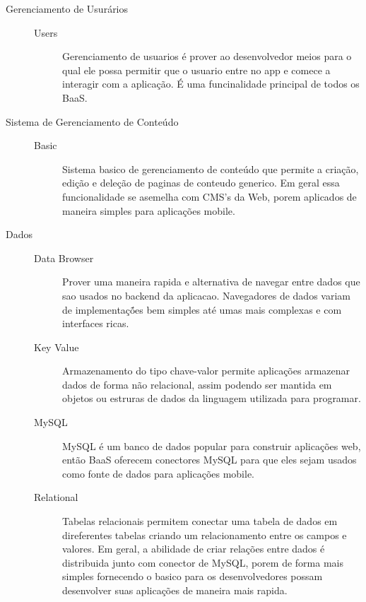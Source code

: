 	\begin{description}
		\item[Gerenciamento de Usurários]
			\begin{description}
            	\item[]
				\item[Users]{Gerenciamento de usuarios é prover ao  desenvolvedor meios para o qual ele possa permitir que o usuario entre no app e comece a interagir com a aplicação. É uma funcinalidade principal de todos os BaaS.}
			\end{description}
		
		\item[Sistema de Gerenciamento de Conteúdo]
			\begin{description}
            	\item[]
				\item[Basic]{Sistema basico de gerenciamento de conteúdo que permite a criação, edição e deleção de paginas de conteudo generico. Em geral essa funcionalidade se asemelha com CMS's da Web, porem aplicados de maneira simples para aplicações mobile.}
			\end{description}
		
		\item[Dados]
			\begin{description}
            	\item[]
				\item[Data Browser] { Prover uma maneira rapida e alternativa de navegar entre dados que sao usados no backend da aplicacao. Navegadores de dados variam de implementaçṍes bem simples até umas mais complexas e com interfaces ricas.}
				
				\item[Key Value] {Armazenamento do tipo chave-valor permite aplicações armazenar dados de forma não relacional, assim podendo ser mantida em objetos ou estruras de dados da linguagem utilizada para programar.}
				
				\item[MySQL] {MySQL é um banco de dados popular para construir aplicações web, então BaaS oferecem conectores MySQL para que eles sejam usados como fonte de dados para aplicações mobile.}
				
				\item[Relational] { Tabelas relacionais permitem conectar uma tabela de dados em direferentes tabelas criando um relacionamento entre os campos e valores. Em geral, a abilidade de criar relações entre dados é distribuida junto com conector de MySQL, porem de forma mais simples fornecendo o basico para os desenvolvedores possam desenvolver suas aplicações de maneira mais rapida.}


\end{description}
\end{description}
